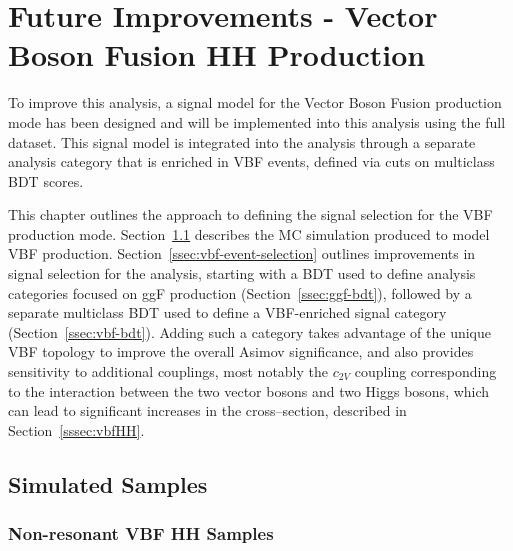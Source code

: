 \chapter{Future Improvements - Vector Boson Fusion HH Production}\label{ch:vbf}

To improve this analysis, a signal model for the Vector Boson Fusion production mode has been designed and will be implemented into this analysis using the full \RunTwo dataset. This signal model is integrated into the analysis through a separate analysis category that is enriched in VBF events, defined via cuts on multiclass \gls{BDT} scores.

This chapter outlines the approach to defining the signal selection for the \gls{VBF} production mode. Section~\ref{sec:vbf-samples} describes the \gls{MC} simulation produced to model VBF \hhyybb production. Section~\ref{ssec:vbf-event-selection} outlines improvements in signal selection for the analysis, starting with a \gls{BDT} used to define analysis categories focused on ggF \hh production (Section~\ref{ssec:ggf-bdt}), followed by a separate multiclass \gls{BDT} used to define a VBF-enriched signal category (Section~\ref{ssec:vbf-bdt}). Adding such a category takes advantage of the unique \gls{VBF} topology to improve the overall Asimov significance, and also provides sensitivity to additional couplings, most notably the $c_{2V}$ coupling corresponding to the interaction between the two vector bosons and two Higgs bosons, which can lead to significant increases in the \hh cross--section, described in Section~\ref{sssec:vbfHH}.

\section{Simulated Samples}\label{sec:vbf-samples}

\subsection{Non-resonant VBF HH Samples}\label{ssec:vbf-samples-production}

